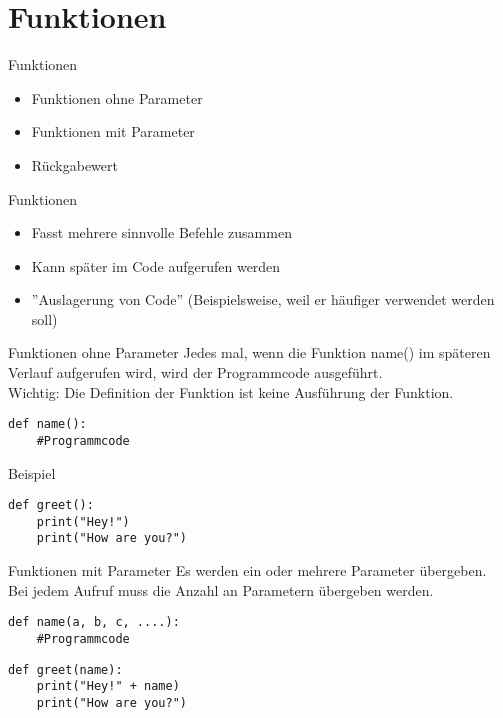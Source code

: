 \section{Funktionen}
\begin{frame}[fragile]{Funktionen}
\begin{itemize}
	\item Funktionen ohne Parameter
	\item Funktionen mit Parameter
	\item Rückgabewert 
\end{itemize}
\end{frame}

\begin{frame}[fragile]{Funktionen}
	\begin{itemize}
		\item Fasst mehrere sinnvolle Befehle zusammen
		\item Kann später im Code aufgerufen werden
		\item ''Auslagerung von Code'' (Beispielsweise, weil er häufiger verwendet werden soll)
	\end{itemize}
\end{frame}

\begin{frame}[fragile]{Funktionen ohne Parameter}
Jedes mal, wenn die Funktion name() im späteren Verlauf aufgerufen wird, wird der Programmcode ausgeführt. \\
Wichtig: Die Definition der Funktion ist keine Ausführung der Funktion.
\begin{lstlisting}
def name():
	#Programmcode
\end{lstlisting}

Beispiel
\begin{lstlisting}
def greet():
    print("Hey!")
    print("How are you?")
\end{lstlisting}
\end{frame}


\begin{frame}[fragile]{Funktionen mit Parameter}
Es werden ein oder mehrere Parameter übergeben. \\
Bei jedem Aufruf muss die Anzahl an Parametern übergeben werden.
\begin{lstlisting}
def name(a, b, c, ....):
	#Programmcode
\end{lstlisting}

\begin{lstlisting}
def greet(name):
	print("Hey!" + name)
	print("How are you?")
\end{lstlisting}
\end{frame}



